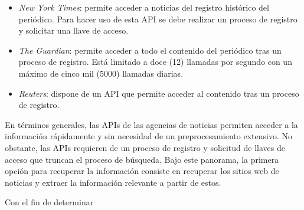\begin{itemize}
    \item \textit{New York Times}: permite acceder a noticias del registro histórico del periódico. Para hacer uso de esta API se debe realizar un proceso de registro y solicitar una llave de acceso.
    
    \item \textit{The Guardian}: permite acceder a todo el contenido del periódico tras un proceso de registro. Está limitado a doce (12) llamadas por segundo con un máximo de cinco mil (5000) llamadas diarias.
    
    \item \textit{Reuters}: dispone de un API que permite acceder al contenido tras un proceso de registro.
\end{itemize}

En términos generales, las APIs de las agencias de noticias permiten acceder a la información rápidamente y sin necesidad de un preprocesamiento extensivo. No obstante, las APIs requieren de un proceso de registro y solicitud de llaves de acceso que truncan el proceso de búsqueda. Bajo este panorama, la primera opción para recuperar la información consiste en recuperar los sitios web de noticias y extraer la información relevante a partir de estos. 

Con el fin de determinar 